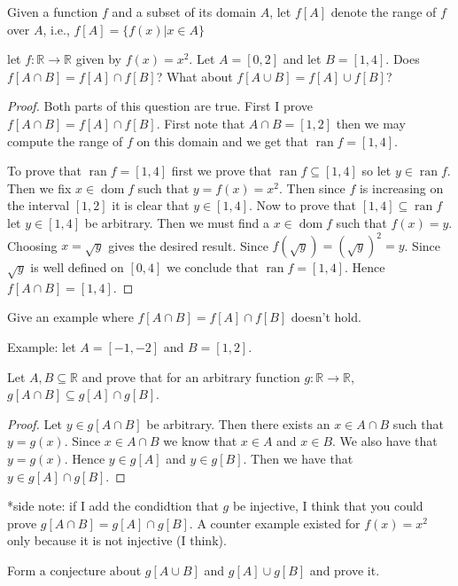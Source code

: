 \documentclass[11pt,largemargins]{homework}
\newcommand{\R}{\mathbb{R}}
\newcommand{\ran}{\operatorname{ran}}
\newcommand{\dom}{\operatorname{dom}}
\begin{document}
\question
Given a function $f$ and a subset of its domain $A$, let $f[A]$ denote the range of $f$ over $A$, i.e., $f[A] = \{f(x) | x \in A \} $

\begin{alphaparts}
    \questionpart
    let $f: \R \to \R$ given by $f(x) = x^2$. Let $A = [0, 2]$ and let $B = [1, 4]$. Does $f[A \cap B] = f[A] \cap f[B]$? What about $f[A \cup B] = f[A] \cup f[B]$? 

    
    \begin{proof}
        Both parts of this question are true. First I prove $f[A \cap B] = f[A] \cap f[B]$. First note that $A \cap B = [1, 2]$ then we may compute the range of $f$ on this domain and we get that $\ran f = [1, 4]$. 

       To prove that $\ran f = [1,4]$ first we prove that $\ran f \subseteq [1, 4]$ so let $y \in \ran f$. Then we fix $x \in \dom f$ such that $y = f(x) = x^2$. Then since $f$ is increasing on the interval $[1,2]$ it is clear that $y \in [1, 4]$. 
       Now to prove that $[1,4] \subseteq \ran f$ let $y \in [1, 4]$ be arbitrary. Then we must find a $x \in \dom f$ such that $f(x) = y$. Choosing $x = \sqrt{y}$ gives the desired result. Since $f(\sqrt{y}) = (\sqrt{y})^2 = y$. Since $\sqrt{y}$ is well defined on $[0, 4]$ 
       we conclude that $\ran f = [1, 4]$. Hence $f[A \cap B] = [1, 4]$. 
    \end{proof}

    \questionpart 
    Give an example where $f[A \cap B] = f[A] \cap f[B]$ doesn't hold. 

    Example: let $A = [-1, -2]$ and $B = [1, 2]$. 

    \questionpart 
    Let $A,B \subseteq \R$ and prove that for an arbitrary function $g: \R \to \R$, $g[A \cap B] \subseteq g[A] \cap g[B]$.

    \begin{proof}
        Let $y \in g[A \cap B]$ be arbitrary. Then there exists an $x \in A \cap B$ such that $y = g(x)$. Since $x \in A \cap B$ we know that $x \in A$ and $x \in B$. We also have that $y = g(x)$. 
        Hence $y \in g[A] $ and $y \in g[B]$. Then we have that $y \in g[A] \cap g[B]$.  
    \end{proof}

    *side note: if I add the condidtion that $g$ be injective, I think that you could prove $g[A \cap B] = g[A] \cap g[B]$. 
    A counter example existed for $f(x) = x^2$ only because it is not injective (I think). 

    \questionpart 
    Form a conjecture about $g[A \cup B]$ and $g[A] \cup g[B]$ and prove it. 


\end{alphaparts}
\end{document}
